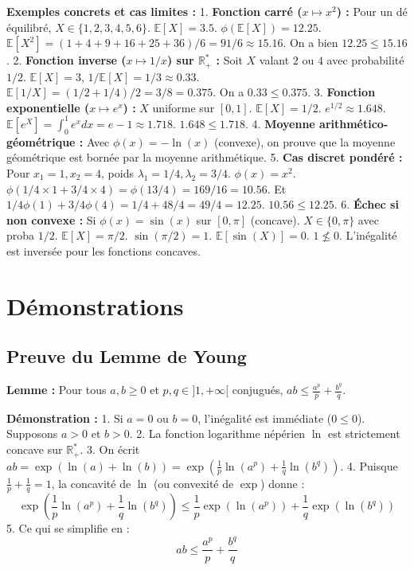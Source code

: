 \documentclass[11pt,a4paper]{article}
\begin{document}
\textbf{Exemples concrets et cas limites :}
1. \textbf{Fonction carré ($x \mapsto x^2$) :} Pour un dé équilibré, $X \in \{1,2,3,4,5,6\}$. $\mathbb{E}[X] = 3.5$. $\phi(\mathbb{E}[X]) = 12.25$. $\mathbb{E}[X^2] = (1+4+9+16+25+36)/6 = 91/6 \approx 15.16$. On a bien $12.25 \le 15.16$.
2. \textbf{Fonction inverse ($x \mapsto 1/x$) sur $\mathbb{R}_+^*$ :} Soit $X$ valant $2$ ou $4$ avec probabilité $1/2$. $\mathbb{E}[X] = 3$, $1/\mathbb{E}[X] = 1/3 \approx 0.33$. $\mathbb{E}[1/X] = (1/2+1/4)/2 = 3/8 = 0.375$. On a $0.33 \le 0.375$.
3. \textbf{Fonction exponentielle ($x \mapsto e^x$) :} $X$ uniforme sur $[0,1]$. $\mathbb{E}[X] = 1/2$. $e^{1/2} \approx 1.648$. $\mathbb{E}[e^X] = \int_0^1 e^x dx = e - 1 \approx 1.718$. $1.648 \le 1.718$.
4. \textbf{Moyenne arithmético-géométrique :} Avec $\phi(x) = -\ln(x)$ (convexe), on prouve que la moyenne géométrique est bornée par la moyenne arithmétique.
5. \textbf{Cas discret pondéré :} Pour $x_1=1, x_2=4$, poids $\lambda_1=1/4, \lambda_2=3/4$. $\phi(x)=x^2$. $\phi(1/4 \times 1 + 3/4 \times 4) = \phi(13/4) = 169/16 = 10.56$. Et $1/4 \phi(1) + 3/4 \phi(4) = 1/4 + 48/4 = 49/4 = 12.25$. $10.56 \le 12.25$.
6. \textbf{Échec si non convexe :} Si $\phi(x) = \sin(x)$ sur $[0, \pi]$ (concave). $X \in \{0, \pi\}$ avec proba $1/2$. $\mathbb{E}[X] = \pi/2$. $\sin(\pi/2) = 1$. $\mathbb{E}[\sin(X)] = 0$. $1 \not\le 0$. L'inégalité est inversée pour les fonctions concaves.

\section*{Démonstrations}

\subsection*{Preuve du Lemme de Young}

\textbf{Lemme :} Pour tous $a, b \ge 0$ et $p, q \in ]1, +\infty[$ conjugués, $ab \le \frac{a^p}{p} + \frac{b^q}{q}$.

\textbf{Démonstration :}
1. Si $a=0$ ou $b=0$, l'inégalité est immédiate ($0 \le 0$). Supposons $a > 0$ et $b > 0$.
2. La fonction logarithme népérien $\ln$ est strictement concave sur $\mathbb{R}_+^*$.
3. On écrit $ab = \exp(\ln(a) + \ln(b)) = \exp \left( \frac{1}{p} \ln(a^p) + \frac{1}{q} \ln(b^q) \right)$.
4. Puisque $\frac{1}{p} + \frac{1}{q} = 1$, la concavité de $\ln$ (ou convexité de $\exp$) donne :
   $$\exp \left( \frac{1}{p} \ln(a^p) + \frac{1}{q} \ln(b^q) \right) \le \frac{1}{p} \exp(\ln(a^p)) + \frac{1}{q} \exp(\ln(b^q))$$
5. Ce qui se simplifie en :
   $$ab \le \frac{a^p}{p} + \frac{b^q}{q}$$
\end{document}
